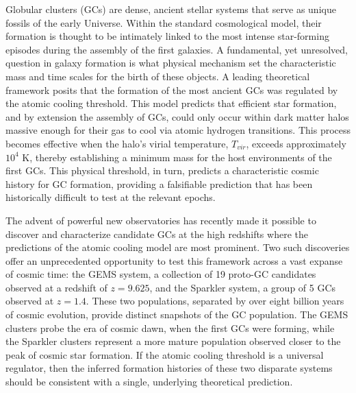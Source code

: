 \documentclass[]{article}
\begin{document}
Globular clusters (GCs) are dense, ancient stellar systems that serve as unique fossils of the early Universe. Within the standard cosmological model, their formation is thought to be intimately linked to the most intense star-forming episodes during the assembly of the first galaxies. A fundamental, yet unresolved, question in galaxy formation is what physical mechanism set the characteristic mass and time scales for the birth of these objects. A leading theoretical framework posits that the formation of the most ancient GCs was regulated by the atomic cooling threshold. This model predicts that efficient star formation, and by extension the assembly of GCs, could only occur within dark matter halos massive enough for their gas to cool via atomic hydrogen transitions. This process becomes effective when the halo's virial temperature, $T_{vir}$, exceeds approximately $10^4$ K, thereby establishing a minimum mass for the host environments of the first GCs. This physical threshold, in turn, predicts a characteristic cosmic history for GC formation, providing a falsifiable prediction that has been historically difficult to test at the relevant epochs.

The advent of powerful new observatories has recently made it possible to discover and characterize candidate GCs at the high redshifts where the predictions of the atomic cooling model are most prominent. Two such discoveries offer an unprecedented opportunity to test this framework across a vast expanse of cosmic time: the GEMS system, a collection of 19 proto-GC candidates observed at a redshift of $z=9.625$, and the Sparkler system, a group of 5 GCs observed at $z=1.4$. These two populations, separated by over eight billion years of cosmic evolution, provide distinct snapshots of the GC population. The GEMS clusters probe the era of cosmic dawn, when the first GCs were forming, while the Sparkler clusters represent a more mature population observed closer to the peak of cosmic star formation. If the atomic cooling threshold is a universal regulator, then the inferred formation histories of these two disparate systems should be consistent with a single, underlying theoretical prediction.
\end{document}
